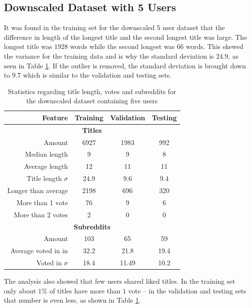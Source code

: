 \subsection{Downscaled Dataset with 5 Users}
\label{sec:five-user-data-set}
It was found in the training set for the downscaled 5 user dataset that the difference in length of the longest title and the second longest title was large. The longest title was $1928$ words while the second longest was $66$ words. This skewed the variance for the training data and is why the standard deviation is $24.9$, as seen in Table \ref{table:5_user_stats}. If the outlier is removed, the standard deviation is brought down to $9.7$ which is similar to the validation and testing sets.
\begin{table}[h!]
    \centering
    \begin{tabular}{ r | c | c | c }
    \textbf{Feature} & \textbf{Training} & \textbf{Validation} & \textbf{Testing} \\ \hline \hline
    \multicolumn{4}{c}{\textbf{Titles}} \\ \hline \hline
    Amount & 6927 & 1983 & 992 \\ \hline
    Median length & 9 & 9 & 8 \\ \hline
    Average length & 12 & 11 & 11  \\ \hline
    Title length $\sigma$ & 24.9 & 9.6 & 9.4 \\ \hline
    Longer than average & 2198 & 696 & 320 \\ \hline
    More than 1 vote & 76 & 9 & 6 \\ \hline
    More than 2 votes & 2 & 0 & 0\\ \hline \hline
    \multicolumn{4}{c}{\textbf{Subreddits}} \\ \hline \hline
    Amount & 103 & 65 & 59  \\ \hline
    Average voted in in & 32.2 & 21.8 & 19.4 \\ \hline
    Voted in $\sigma$ & 18.4 & 11.49 & 10.2  \\ \hline
    \end{tabular}
    \caption{Statistics regarding title length, votes and subreddits for the downscaled dataset containing five users}
    \label{table:5_user_stats}
\end{table}
The analysis also showed that few users shared liked titles. In the training set only about $1\%$ of titles have more than $1$ vote -- in the validation and testing sets that number is even less, as shown in Table \ref{table:5_user_stats}.
